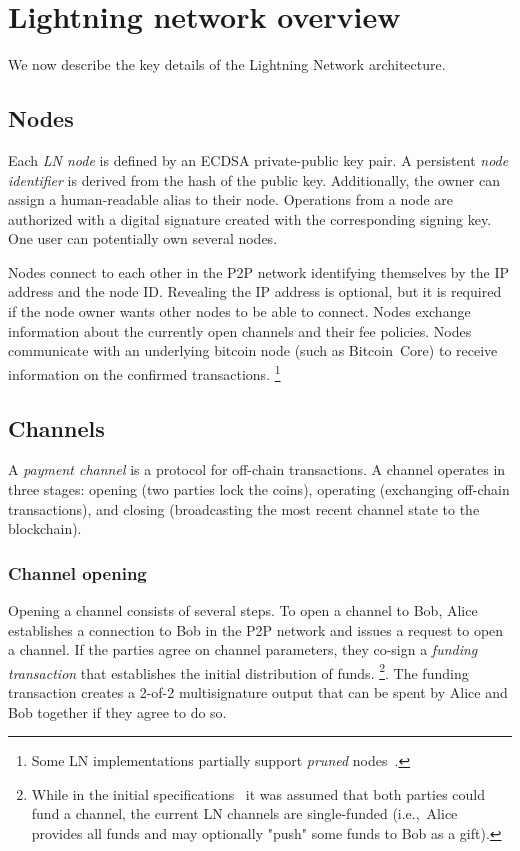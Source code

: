 \section{Lightning network overview}

We now describe the key details of the Lightning Network architecture.

\subsection{Nodes}

Each \textit{LN node} is defined by an ECDSA private-public key pair.
A persistent \textit{node identifier} is derived from the hash of the public key. 
Additionally, the owner can assign a human-readable alias to their node.
Operations from a node are authorized with a digital signature created with the corresponding signing key.
One user can potentially own several nodes.

Nodes connect to each other in the P2P network identifying themselves by the IP address and the node ID.
Revealing the IP address is optional, but it is required if the node owner wants other nodes to be able to connect.
Nodes exchange information about the currently open channels and their fee policies.
Nodes communicate with an underlying bitcoin node (such as Bitcoin~Core) to receive information on the confirmed transactions.
\footnote{Some LN implementations partially support \textit{pruned} nodes~\cite{LNDInstall}.}


\subsection{Channels}

A \textit{payment channel} is a protocol for off-chain transactions.
A channel operates in three stages: opening (two parties lock the coins), operating (exchanging off-chain transactions), and closing (broadcasting the most recent channel state to the blockchain).


\subsubsection*{Channel opening}

Opening a channel consists of several steps.
To open a channel to Bob, Alice establishes a connection to Bob in the P2P network and issues a request to open a channel.
If the parties agree on channel parameters, they co-sign a \textit{funding transaction} that establishes the initial distribution of funds.
\footnote{While in the initial specifications~\cite{Poon2016} it was assumed that both parties could fund a channel, the current LN channels are single-funded (i.e.,~Alice provides all funds and may optionally "push" some funds to Bob as a gift).}.
The funding transaction creates a 2-of-2 multisignature output that can be spent by Alice and Bob together if they agree to do so.

